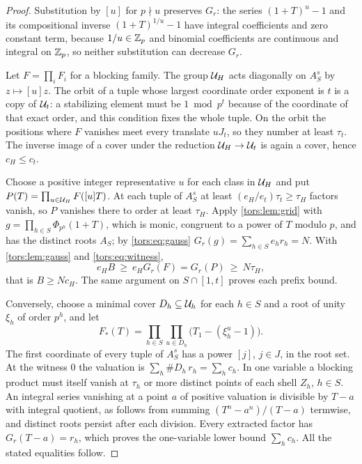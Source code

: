 \begin{proof}
Substitution by $[u]$ for $p\nmid u$ preserves $G_r$: the series $(1+T)^u-1$ and its
compositional inverse $(1+T)^{1/u}-1$ have integral coefficients and zero constant term,
because $1/u\in\mathbb{Z}_p$ and binomial coefficients are continuous and integral on $\mathbb{Z}_p$, so
neither substitution can decrease $G_r$.

Let $F=\prod_iF_i$ for a blocking family. The group $\mathcal{U}_H$ acts diagonally on $A_S^s$ by
$z\mapsto[u]z$. The orbit of a tuple whose largest coordinate order exponent is $t$ is a copy
of $\mathcal{U}_t$: a stabilizing element must be $1\bmod p^t$ because of the coordinate of that
exact order, and this condition fixes the whole tuple. On the orbit the positions where $F$
vanishes meet every translate $uJ_t$, so they number at least $\tau_t$. The inverse image
of a cover under the reduction $\mathcal{U}_H\to\mathcal{U}_t$ is again a cover, hence $c_H\le c_t$.

Choose a positive integer representative $u$ for each class in $\mathcal{U}_H$ and put
$P(T)=\prod_{u\in\mathcal{U}_H}F([u]T)$. At each tuple of $A_S^s$ at least
$(e_H/e_t)\tau_t\ge\tau_H$ factors vanish, so $P$ vanishes there to order at least
$\tau_H$. Apply \cref{tors:lem:grid} with $g=\prod_{h\in S}\Phi_{p^h}(1+T)$, which is monic,
congruent to a power of $T$ modulo $p$, and has the distinct roots $A_S$; by
\eqref{tors:eq:gauss} $G_r(g)=\sum_{h\in S}e_hr_h=N$. With \cref{tors:lem:gauss} and
\eqref{tors:eq:witness},
\[
  e_HB\ \ge\ e_HG_r(F)=G_r(P)\ \ge\ N\tau_H ,
\]
that is $B\ge Nc_H$. The same argument on $S\cap[1,t]$ proves each prefix bound.

Conversely, choose a minimal cover $D_h\subseteq\mathcal{U}_h$ for each $h\in S$ and a root of unity
$\xi_h$ of order $p^h$, and let
\[
  F_*(T)=\prod_{h\in S}\prod_{u\in D_h}\bigl(T_1-(\xi_h^u-1)\bigr).
\]
The first coordinate of every tuple of $A_S^s$ has a power $[j]$, $j\in J$, in the root
set. At the witness $0$ the valuation is $\sum_h\#D_h\,r_h=\sum_hc_h$. In one variable a
blocking product must itself vanish at $\tau_h$ or more distinct points of each shell
$Z_h$, $h\in S$. An integral series vanishing at a point $a$ of positive valuation is
divisible by $T-a$ with integral quotient, as follows from summing $(T^n-a^n)/(T-a)$
termwise, and distinct roots persist after each division. Every extracted factor has
$G_r(T-a)=r_h$, which proves the one-variable lower bound $\sum_hc_h$. All the stated
equalities follow.
\end{proof}


